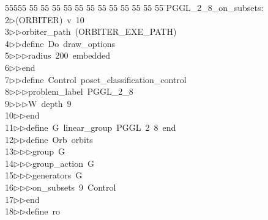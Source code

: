 %
%
\begin{tabbing}
55555 \= 55 \= 55 \= 55 \= 55 \= 55 \= 55 \= 55 \= 55 \= 55 \= 55 \= 55 \= 55 \= \>PGGL\_2\_8\_on\_subsets:\\[0pt]
2\>$\triangleright$\>(ORBITER)\ v\ 10\ \\[0pt]
3\>$\triangleright$\>$\triangleright$\>orbiter\_path\ (ORBITER\_EXE\_PATH)\ \\[0pt]
4\>$\triangleright$\>$\triangleright$\>define\ Do\ draw\_options\ \\[0pt]
5\>$\triangleright$\>$\triangleright$\>$\triangleright$\>radius\ 200\ embedded\ \\[0pt]
6\>$\triangleright$\>$\triangleright$\>end\ \\[0pt]
7\>$\triangleright$\>$\triangleright$\>define\ Control\ poset\_classification\_control\ \\[0pt]
8\>$\triangleright$\>$\triangleright$\>$\triangleright$\>problem\_label\ PGGL\_2\_8\ \\[0pt]
9\>$\triangleright$\>$\triangleright$\>$\triangleright$\>W\ depth\ 9\ \\[0pt]
10\>$\triangleright$\>$\triangleright$\>end\ \\[0pt]
11\>$\triangleright$\>$\triangleright$\>define\ G\ linear\_group\ PGGL\ 2\ 8\ end\ \\[0pt]
12\>$\triangleright$\>$\triangleright$\>define\ Orb\ orbits\ \\[0pt]
13\>$\triangleright$\>$\triangleright$\>$\triangleright$\>group\ G\ \\[0pt]
14\>$\triangleright$\>$\triangleright$\>$\triangleright$\>group\_action\ G\ \\[0pt]
15\>$\triangleright$\>$\triangleright$\>$\triangleright$\>generators\ G\ \\[0pt]
16\>$\triangleright$\>$\triangleright$\>$\triangleright$\>on\_subsets\ 9\ Control\ \\[0pt]
17\>$\triangleright$\>$\triangleright$\>end\ \\[0pt]
18\>$\triangleright$\>$\triangleright$\>define\ ro\ \\[0pt]

\end{tabbing}
